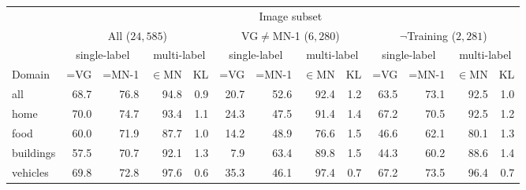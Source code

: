 \begin{table*}
	\centering
	\small
	\begin{tabular}{l@{~}|@{~}r@{~}r@{~}rr@{~}|@{~}r@{~}r@{~}rr@{~}|@{~}r@{~}r@{~}rr}
		\toprule
		& \multicolumn{12}{c}{Image subset} \\
		&	\multicolumn{4}{c}{All ($24,585$)} 
		& \multicolumn{4}{c}{VG$\neq$MN-1 ($6,280$)}
		& \multicolumn{4}{c}{$\neg$Training ($2,281$)} \\
		\midrule
		&  \multicolumn{2}{c}{single-label}
		&  \multicolumn{2}{c}{multi-label}
		&  \multicolumn{2}{c}{single-label}
		&  \multicolumn{2}{c}{multi-label}
		&  \multicolumn{2}{c}{single-label}
		&  \multicolumn{2}{c}{multi-label} \\
		Domain	 &  =VG & =MN-1 & $\in$MN  &  KL
		&  =VG & =MN-1 & $\in$MN  & KL
		&  =VG & =MN-1 & $\in$MN  & KL\\ 
		\midrule \vspace{.6ex}
		all            &               68.7 &                 76.8 &                   94.8 &            0.9 &            20.7 &              52.6 &                92.4 &         1.2 &             63.5 &               73.1 &                 92.5 &          1.0 \\ 
		home           &               70.0 &                 74.7 &                   93.4 &            1.1 &            24.3 &              47.5 &                91.4 &         1.4 &             67.2 &               70.5 &                 92.5 &          1.2 \\
		food           &               60.0 &                 71.9 &                   87.7 &            1.0 &            14.2 &              48.9 &                76.6 &         1.5 &             46.6 &               62.1 &                 80.1 &          1.3 \\
		buildings      &               57.5 &                 70.7 &                   92.1 &            1.3 &             7.9 &              63.4 &                89.8 &         1.5 &             44.3 &               60.2 &                 88.6 &          1.4 \\
		vehicles       &               69.8 &                 72.8 &                   97.6 &            0.6 &            35.3 &              46.1 &                97.4 &         0.7 &             67.2 &               73.5 &                 96.4 &          0.7 \\

\end{tabular}
\end{table*}

